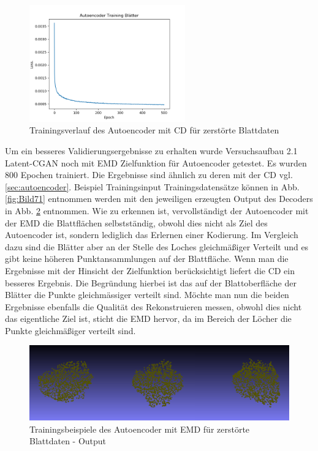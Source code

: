 \documentclass{llncs}
\begin{document}
\begin{figure}[htbp] 
	\centering
	\includegraphics[width=0.6\textwidth]{autoencoder_training_blaetter_result.png}
	\caption{Trainingsverlauf des Autoencoder mit CD für zerstörte Blattdaten}
	\label{fig:Bild67}
\end{figure}
\pagebreak\linebreak 
Um ein besseres Validierungsergebnisse zu erhalten wurde Versuchsaufbau 2.1 Latent-CGAN noch mit EMD Zielfunktion für Autoencoder getestet. Es wurden 800 Epochen trainiert. Die Ergebnisse sind ähnlich zu deren mit der CD vgl.\ref{sec:autoencoder}. Beispiel Trainingsinput Trainingsdatensätze können in Abb. \ref{fig:Bild71} entnommen werden mit den jeweiligen erzeugten Output des Decoders in Abb. \ref{fig:Bild72} entnommen. Wie zu erkennen ist, vervollständigt der Autoencoder mit der EMD die Blattflächen selbstständig, obwohl dies nicht als Ziel des Autoencoder ist, sondern lediglich das Erlernen einer Kodierung. Im Vergleich dazu sind die Blätter aber an der Stelle des Loches gleichmäßiger Verteilt und es gibt keine höheren Punktansammlungen auf der Blattfläche. Wenn man die Ergebnisse mit der Hinsicht der Zielfunktion berücksichtigt liefert die CD ein besseres Ergebnis. Die Begründung hierbei ist das auf der Blattoberfläche der Blätter die Punkte gleichmässiger verteilt sind. Möchte man nun die beiden Ergebnisse ebenfalls die Qualität des Rekonstruieren messen, obwohl dies nicht das eigentliche Ziel ist, sticht die EMD hervor, da im Bereich der Löcher die Punkte gleichmäßiger verteilt sind.
\begin{figure}[htbp] 
	\centering
	\includegraphics[width=1.0\textwidth]{repairded_emd.png}
	\caption{Trainingsbeispiele des Autoencoder mit EMD für zerstörte Blattdaten - Output}
	\label{fig:Bild72}
\end{figure}
\end{document}
